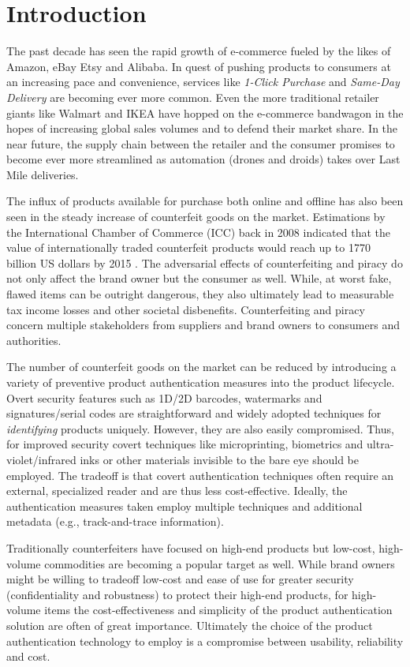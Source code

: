 \documentclass[thesis.tex]{subfiles}
\begin{document}
\chapter{Introduction}
\label{chapter:intro}

The past decade has seen the rapid growth of e-commerce fueled by the likes of Amazon, eBay Etsy and Alibaba. In quest of pushing products to consumers at an increasing pace and convenience, services like \emph{1-Click Purchase} and \emph{Same-Day Delivery} are becoming ever more common. Even the more traditional retailer giants like Walmart and IKEA have hopped on the e-commerce bandwagon in the hopes of increasing global sales volumes and to defend their market share. In the near future, the supply chain between the retailer and the consumer promises to become ever more streamlined as automation (drones and droids) takes over Last Mile deliveries.

The influx of products available for purchase both online and offline has also been seen in the steady increase of counterfeit goods on the market. Estimations by the International Chamber of Commerce (ICC) back in 2008 indicated that the value of internationally traded counterfeit products would reach up to 1770 billion US dollars by 2015 \cite{icc}. The adversarial effects of counterfeiting and piracy do not only affect the brand owner but the consumer as well. While, at worst fake, flawed items can be outright dangerous, they also ultimately lead to measurable tax income losses and other societal disbenefits. Counterfeiting and piracy concern multiple stakeholders from suppliers and brand owners to consumers and authorities.

The number of counterfeit goods on the market can be reduced by introducing a variety of preventive product authentication measures into the product lifecycle. Overt security features such as 1D/2D barcodes, watermarks and signatures/serial codes are straightforward and widely adopted techniques for \emph{identifying} products uniquely. However, they are also easily compromised. Thus, for improved security covert techniques like microprinting, biometrics and ultra-violet/infrared inks or other materials invisible to the bare eye should be employed. The tradeoff is that covert authentication techniques often require an external, specialized reader and are thus less cost-effective. Ideally, the authentication measures taken employ multiple techniques and additional metadata (e.g., track-and-trace information).

Traditionally counterfeiters have focused on high-end products but low-cost, high-volume commodities are becoming a popular target as well. While brand owners might be willing to tradeoff low-cost and ease of use for greater security (confidentiality and robustness) to protect their high-end products, for high-volume items the cost-effectiveness and simplicity of the product authentication solution are often of great importance. Ultimately the choice of the product authentication technology to employ is a compromise between usability, reliability and cost.
\end{document}
